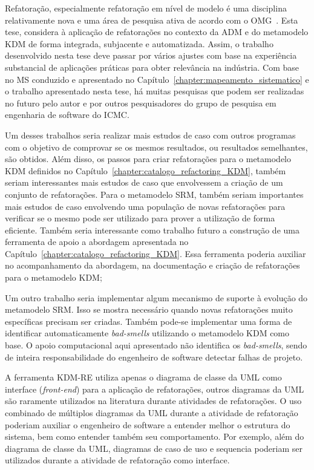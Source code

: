 Refatoração, especialmente refatoração em nível de modelo é uma disciplina relativamente nova e uma área de pesquisa ativa de acordo com o OMG~\cite{OMG_OMG, ADM:OMG}. Esta tese, considera à aplicação de refatorações no contexto da ADM e do metamodelo KDM de forma integrada, subjacente e automatizada. Assim, o trabalho desenvolvido nesta tese deve passar por vários ajustes com base na experiência substancial de aplicações práticas para obter relevância na indústria. Com base no MS conduzido e apresentado no Capítulo~\ref{chapter:mapeamento_sistematico} e o trabalho apresentado nesta tese, há muitas pesquisas que podem ser realizadas no futuro pelo autor e por outros pesquisadores do grupo de pesquisa em engenharia de software do ICMC.

Um desses trabalhos seria realizar mais estudos de caso com outros programas com o objetivo de comprovar se os mesmos resultados, ou resultados semelhantes, são obtidos. Além disso, os passos para criar refatorações para o metamodelo KDM definidos no Capítulo~\ref{chapter:catalogo_refactoring_KDM}, também seriam interessantes mais estudos de caso que envolvessem a criação de um conjunto de refatorações. Para o metamodelo SRM, também seriam importantes mais estudos de caso envolvendo uma população de novas refatorações para verificar se o mesmo pode ser utilizado para prover a utilização de forma eficiente. Também seria interessante como trabalho futuro a construção de uma ferramenta de apoio a abordagem apresentada no Capítulo~\ref{chapter:catalogo_refactoring_KDM}. Essa ferramenta poderia auxiliar no acompanhamento da abordagem, na documentação e criação de refatorações para o metamodelo KDM;

Um outro trabalho seria implementar algum mecanismo de suporte à evolução do metamodelo SRM. Isso se mostra necessário quando novas refatorações muito específicas precisam ser criadas. Também pode-se implementar uma forma de identificar automaticamente \textit{bad-smells} utilizando o metamodelo KDM como base. O apoio computacional aqui apresentado não identifica os \textit{bad-smells}, sendo de inteira responsabilidade do engenheiro de software detectar falhas de projeto.


A ferramenta KDM-RE utiliza apenas o diagrama de classe da UML como interface (\textit{front-end}) para a aplicação de refatorações, outros diagramas da UML são raramente utilizados na literatura durante atividades de refatorações. O uso combinado de múltiplos diagramas da UML durante a atividade de refatoração poderiam auxiliar o engenheiro de software a entender melhor o estrutura do sistema, bem como entender também seu comportamento. Por exemplo, além do diagrama de classe da UML, diagramas de caso de uso e sequencia poderiam ser utilizados durante a atividade de refatoração como interface. 